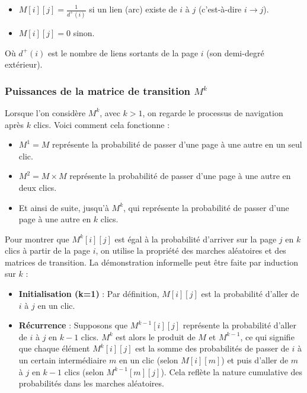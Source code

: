 \begin{itemize}
    \item $M[i][j] = \frac{1}{d^+(i)}$ si un lien (arc) existe de $i$ à $j$ (c'est-à-dire $i \rightarrow j$).
    \item $M[i][j] = 0$ sinon.
\end{itemize}

Où $d^+(i)$ est le nombre de liens sortants de la page $i$ (son demi-degré extérieur).

\subsubsection{Puissances de la matrice de transition $M^k$}

Lorsque l'on considère $M^k$, avec $k > 1$, on regarde le processus de navigation après $k$ clics. Voici comment cela fonctionne :

\begin{itemize}
    \item $M^1 = M$ représente la probabilité de passer d'une page à une autre en un seul clic.
    \item $M^2 = M \times M$ représente la probabilité de passer d'une page à une autre en deux clics.
    \item Et ainsi de suite, jusqu'à $M^k$, qui représente la probabilité de passer d'une page à une autre en $k$ clics.
\end{itemize}

Pour montrer que $M^k[i][j]$ est égal à la probabilité d'arriver sur la page $j$ en $k$ clics à partir de la page $i$, on utilise la propriété des marches aléatoires et des matrices de transition. La démonstration informelle peut être faite par induction sur $k$ :

\begin{itemize}
    \item \textbf{Initialisation (k=1)} : Par définition, $M[i][j]$ est la probabilité d'aller de $i$ à $j$ en un clic.
    \item \textbf{Récurrence} : Supposons que $M^{k-1}[i][j]$ représente la probabilité d'aller de $i$ à $j$ en $k-1$ clics. $M^k$ est alors le produit de $M$ et $M^{k-1}$, ce qui signifie que chaque élément $M^k[i][j]$ est la somme des probabilités de passer de $i$ à un certain intermédiaire $m$ en un clic (selon $M[i][m]$) et puis d'aller de $m$ à $j$ en $k-1$ clics (selon $M^{k-1}[m][j]$). Cela reflète la nature cumulative des probabilités dans les marches aléatoires.
\end{itemize}

